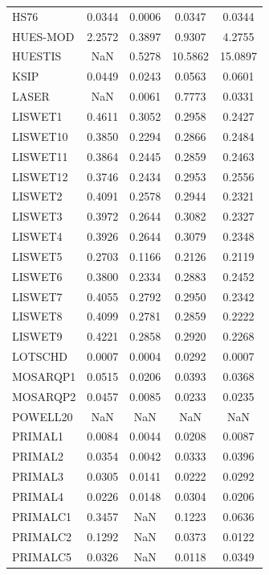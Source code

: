 \begin{longtable}{lcccc}
HS76     &   0.0344 &   0.0006 &   0.0347 &   0.0344 \\
HUES-MOD &   2.2572 &   0.3897 &   0.9307 &   4.2755 \\
HUESTIS  &      NaN &   0.5278 &  10.5862 &  15.0897 \\
KSIP     &   0.0449 &   0.0243 &   0.0563 &   0.0601 \\
LASER    &      NaN &   0.0061 &   0.7773 &   0.0331 \\
LISWET1  &   0.4611 &   0.3052 &   0.2958 &   0.2427 \\
LISWET10 &   0.3850 &   0.2294 &   0.2866 &   0.2484 \\
LISWET11 &   0.3864 &   0.2445 &   0.2859 &   0.2463 \\
LISWET12 &   0.3746 &   0.2434 &   0.2953 &   0.2556 \\
LISWET2  &   0.4091 &   0.2578 &   0.2944 &   0.2321 \\
LISWET3  &   0.3972 &   0.2644 &   0.3082 &   0.2327 \\
LISWET4  &   0.3926 &   0.2644 &   0.3079 &   0.2348 \\
LISWET5  &   0.2703 &   0.1166 &   0.2126 &   0.2119 \\
LISWET6  &   0.3800 &   0.2334 &   0.2883 &   0.2452 \\
LISWET7  &   0.4055 &   0.2792 &   0.2950 &   0.2342 \\
LISWET8  &   0.4099 &   0.2781 &   0.2859 &   0.2222 \\
LISWET9  &   0.4221 &   0.2858 &   0.2920 &   0.2268 \\
LOTSCHD  &   0.0007 &   0.0004 &   0.0292 &   0.0007 \\
MOSARQP1 &   0.0515 &   0.0206 &   0.0393 &   0.0368 \\
MOSARQP2 &   0.0457 &   0.0085 &   0.0233 &   0.0235 \\
POWELL20 &      NaN &      NaN &      NaN &      NaN \\
PRIMAL1  &   0.0084 &   0.0044 &   0.0208 &   0.0087 \\
PRIMAL2  &   0.0354 &   0.0042 &   0.0333 &   0.0396 \\
PRIMAL3  &   0.0305 &   0.0141 &   0.0222 &   0.0292 \\
PRIMAL4  &   0.0226 &   0.0148 &   0.0304 &   0.0206 \\
PRIMALC1 &   0.3457 &      NaN &   0.1223 &   0.0636 \\
PRIMALC2 &   0.1292 &      NaN &   0.0373 &   0.0122 \\
PRIMALC5 &   0.0326 &      NaN &   0.0118 &   0.0349 \\

\end{longtable}

